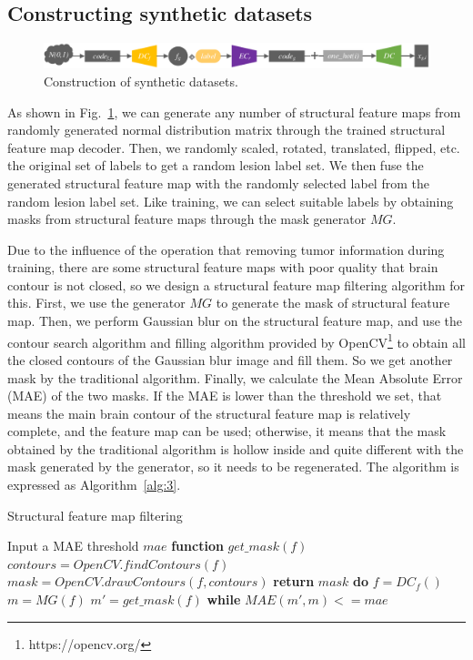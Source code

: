 \documentclass[letterpaper]{article} %
\begin{document}
\subsection{Constructing synthetic datasets}
\label{make dataset}
\begin{figure}
	\centering
	\includegraphics[width=0.98\columnwidth]{figures/make_data}
	\caption{Construction of synthetic datasets.}
	\label{make_data}
\end{figure}
As shown in Fig.~\ref{make_data}, we can generate any number of structural feature maps from randomly generated normal distribution matrix through the trained structural feature map decoder. Then, we randomly scaled, rotated, translated, flipped, etc. the original set of labels to get a random lesion label set. We then fuse the generated structural feature map with the randomly selected label from the random lesion label set. Like training, we can select suitable labels by obtaining masks from structural feature maps through the mask generator $MG$.

Due to the influence of the operation that removing tumor information during training, there are some structural feature maps with poor quality that brain contour is not closed, so we design a structural feature map filtering algorithm for this. First, we use the generator $MG$ to generate the mask of structural feature map. Then, we perform Gaussian blur\cite{92wink2004denoising} on the structural feature map, and use the contour search algorithm and filling algorithm provided by OpenCV\footnote{https://opencv.org/} to obtain all the closed contours of the Gaussian blur image and fill them. So we get another mask by the traditional algorithm. Finally, we calculate the Mean Absolute Error (MAE) of the two masks. If the MAE is lower than the threshold we set, that means the main brain contour of the structural feature map is relatively complete, and the feature map can be used; otherwise, it means that the mask obtained by the traditional algorithm is hollow inside and quite different with the mask generated by the generator, so it needs to be regenerated. The algorithm is expressed as Algorithm~\ref{alg:3}.
\begin{algorithm}
	\caption{Structural feature map filtering}
	\label{alg:3}
	\begin{algorithmic}[1]
		\State Input a MAE threshold $mae$
		\State \textbf{function} $get\_mask(f)$
		\State \indent$contours = OpenCV.findContours(f)$
		\State \indent$mask =OpenCV.drawContours(f,contours)$
		\State \indent\textbf{return} $mask$
		\State \textbf{do} 
		\State \indent$f = DC_f()$
		\State \indent$m = MG(f)$
		\State \indent$m'= get\_mask(f)$
		\State \textbf{while} $MAE(m',m) <= mae$
	\end{algorithmic}  
\end{algorithm}
\end{document}
